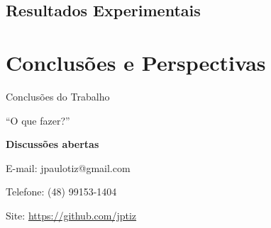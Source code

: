 \subsection{Resultados Experimentais}

\section{Conclusões e Perspectivas}

\begin{frame}{Conclusões do Trabalho}
\end{frame}

\begin{frame}{``O que fazer?''}
\end{frame}

{
    \begin{frame}[plain]
        \vspace{15mm}
        \begin{center}
            \textcolor{cinza}{\textbf{Discussões abertas}}
        \end{center}
        \vspace{-6mm}
        \begin{center}
        \textcolor{cinza}{
            \scriptsize{E-mail: jpaulotiz@gmail.com}}
        \end{center}
        \vspace{-6mm}
        \begin{center}
        \textcolor{cinza}{\scriptsize{Telefone: (48) 99153-1404}}
        \end{center}
        \vspace{-6mm}
        \begin{center}
        \textcolor{cinza}{\scriptsize{
            Site: \url{https://github.com/jptiz}
        }}
        \end{center}
    \end{frame}
}



